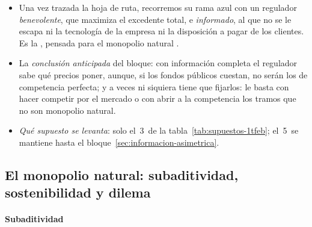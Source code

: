 \documentclass[11pt]{article}
\begin{document}
\begin{itemize}
\item Una vez trazada la hoja de ruta, recorremos su rama azul con un regulador \emph{benevolente}, que maximiza el excedente total, e \emph{informado}, al que no se le escapa ni la tecnología de la empresa ni la disposición a pagar de los clientes. Es la , pensada para el monopolio natural\nocite{UMA2006Regulacion} .
\item La \emph{conclusión anticipada} del bloque: con información completa el regulador sabe qué precios poner, aunque, si los fondos públicos cuestan, no serán los de competencia perfecta; y a veces ni siquiera tiene que fijarlos: le basta con hacer competir por el mercado o con abrir a la competencia los tramos que no son monopolio natural.
\item \emph{Qué supuesto se levanta}: solo el~3~de la tabla~\ref{tab:supuestos-1tfeb}; el~5~se mantiene hasta el bloque~\ref{sec:informacion-asimetrica}.
\end{itemize}

\subsection{El monopolio natural: subaditividad, sostenibilidad y dilema}\label{sec:monopolio-natural}

\paragraph{Subaditividad}
\end{document}
